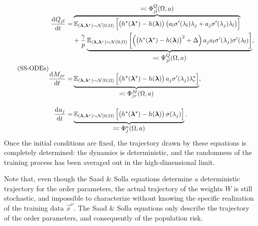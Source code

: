 \begin{equation} \label{eq:intro:ss-odes} \tag{SS-ODEs}
\begin{aligned}
    \dod{Q_{jl}}{t} =& \overbrace{\mathbb{E}_{(\vec{\lambda}, \vec{\lambda}^\star) \sim \mathcal{N}(0, \Omega)}
    \left[ \left( h^\star(\vec{\lambda}^{\star}) - h(\vec{\lambda}) \right) \left( a_l \sigma'(\lambda_l) \lambda_j + a_j \sigma'(\lambda_j) \lambda_l  \right)\right]}^{\textstyle \eqqcolon \Phi^{Q}_{jl}(\Omega, a)}\\ & + \frac{\gamma}{p} \underbrace{\mathbb{E}_{(\vec{\lambda}, \vec{\lambda}^\star) \sim \mathcal{N}(0, \Omega)}\left[ \left(\left( h^\star(\vec{\lambda}^{\star}) - h(\vec{\lambda}) \right)^2+\Delta\right) a_j a_l \sigma'(\lambda_j) \sigma'(\lambda_l) \right]}_{\textstyle \eqqcolon \Psi^{Q}_{jl}(\Omega, a)}, \\[0.9em]
    \dod{M_{jr}}{t} =& \underbrace{\mathbb{E}_{(\vec{\lambda}, \vec{\lambda}^\star) \sim \mathcal{N}(0, \Omega)} \left[ \left( h^\star(\vec{\lambda}^{\star}) - h(\vec{\lambda}) \right) a_j \sigma'(\lambda_j) \lambda^{\star}_r \right]}_{\textstyle \eqqcolon \Phi^{M}_{jr}(\Omega, a)}, \\[0.9em]
    \dod{a_j}{t} =& \underbrace{\mathbb{E}_{(\vec{\lambda}, \vec{\lambda}^\star) \sim \mathcal{N}(0, \Omega)} \left[ \left( h^\star(\vec{\lambda}^{\star}) - h(\vec{\lambda}) \right) \sigma(\lambda_j) \right]}_{\textstyle \eqqcolon \Phi^{a}_{j}(\Omega, a)}.
\end{aligned}
\end{equation}
Once the initial conditions are fixed, the trajectory drawn by these equations is completely determined: the dynamics is deterministic, and the randomness of the training process has been averaged out in the high-dimensional limit.
\begin{remark}
    Note that, even though the Saad \& Solla equations determine a deterministic trajectory for the order parameters, the actual trajectory of the weights $W$ is still stochastic, and impossible to characterize without knowing the specific realization of the training data \(\vec{x}^\nu\). The Saad \& Solla equations only describe the trajectory of the order parameters, and consequently of the population risk.
\end{remark}

